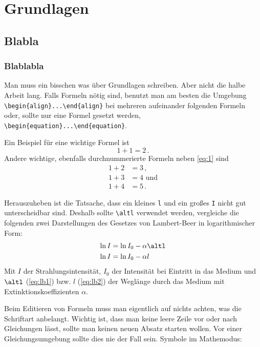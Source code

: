 \chapter{Grundlagen}
\begingroup
\color{blue}
\section{Blabla}
\subsection{Blablabla}
Man muss ein bisschen was über Grundlagen schreiben. Aber nicht die halbe Arbeit
lang. Falls Formeln nötig sind, benutzt man am besten die Umgebung
\verb|\begin{align}|\hskip0pt\verb|...|\hskip0pt\verb|\end{align}|
bei mehreren aufeinander folgenden Formeln oder, sollte nur eine Formel gesetzt
werden, 
\verb|\begin{equation}|\hskip0pt\verb|...|\hskip0pt\verb|\end{equation}|.

Ein Beispiel für eine wichtige Formel ist
\begin{equation}
  1+1 = 2\,\text{.}
  \label{eq:1}
\end{equation}
Andere wichtige, ebenfalls durchnummerierte Formeln neben \autoref{eq:1} sind
\begin{align}
  1+2 &= 3\,\text{,}\label{eq:2}\\
  1+3 &= 4\text{ und}\label{eq:3}\\
  1+4 &= 5\,\text{.}\label{eq:4}
\end{align}

Herauszuheben ist die Tatsache, dass ein kleines \texttt{l} und ein großes
\texttt{I} nicht gut unterscheidbar sind. Deshalb sollte \verb|\altl| verwendet
werden, vergleiche die folgenden zwei Darstellungen des Gesetzes von
Lambert-Beer in logarithmischer Form:
\begin{align}
  \ln I &= \ln I_0 - \alpha\altl\label{eq:lb1}\\
  \ln I &= \ln I_0 - \alpha l\label{eq:lb2}
\end{align}
Mit $I$ der Strahlungsintensität, $I_0$ der Intensität bei Eintritt in das
Medium und $\altl$ (\autoref{eq:lb1}) bzw. $l$ (\autoref{eq:lb2}) der Weglänge
durch das Medium mit Extinktionskoeffizienten $\alpha$.

Beim Editieren von Formeln muss man eigentlich auf nichts achten, was die
Schriftart anbelangt. Wichtig ist, dass man keine leere Zeile vor oder nach
Gleichungen lässt, sollte man keinen neuen Absatz starten wollen. Vor einer
Gleichungsumgebung sollte dies nie der Fall sein.
\newpage
Symbole im Mathemodus:

